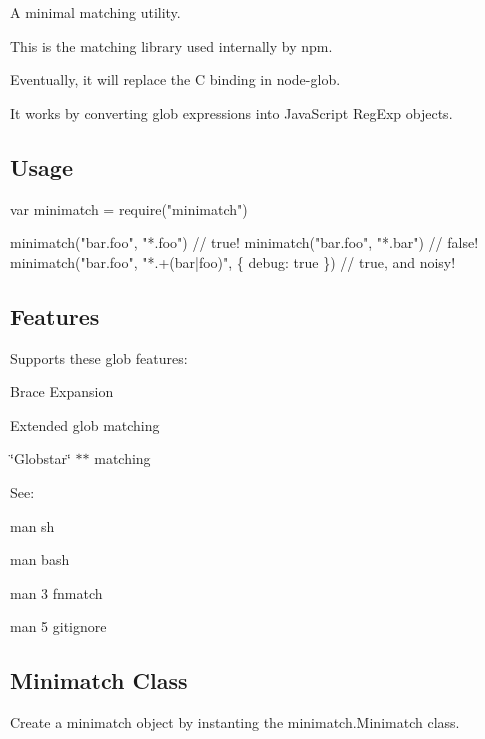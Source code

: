 A minimal matching utility.

\href{http://travis-ci.org/isaacs/minimatch}{\tt }

This is the matching library used internally by npm.

Eventually, it will replace the C binding in node-\/glob.

It works by converting glob expressions into Java\+Script {\ttfamily Reg\+Exp} objects.

\subsection*{Usage}


\begin{DoxyCode}
var minimatch = require("minimatch")

minimatch("bar.foo", "*.foo") // true!
minimatch("bar.foo", "*.bar") // false!
minimatch("bar.foo", "*.+(bar|foo)", \{ debug: true \}) // true, and noisy!
\end{DoxyCode}


\subsection*{Features}

Supports these glob features\+:


\begin{DoxyItemize}
\item Brace Expansion
\item Extended glob matching
\item \char`\"{}\+Globstar\char`\"{} {\ttfamily $\ast$$\ast$} matching
\end{DoxyItemize}

See\+:


\begin{DoxyItemize}
\item {\ttfamily man sh}
\item {\ttfamily man bash}
\item {\ttfamily man 3 fnmatch}
\item {\ttfamily man 5 gitignore}
\end{DoxyItemize}

\subsection*{Minimatch Class}

Create a minimatch object by instanting the {\ttfamily minimatch.\+Minimatch} class.


